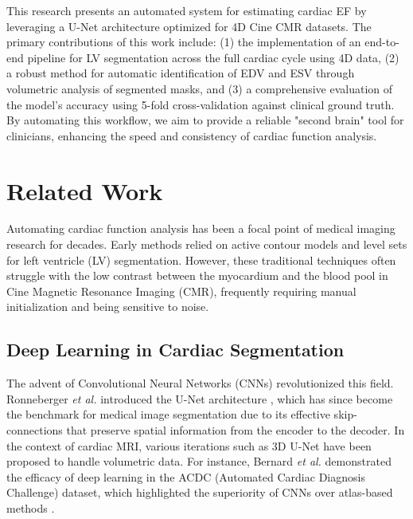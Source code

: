 \documentclass[final,3p,times,twocolumn]{elsarticle}
\begin{document}
This research presents an automated system for estimating cardiac EF by leveraging a U-Net architecture optimized for 4D Cine CMR datasets. The primary contributions of this work include: (1) the implementation of an end-to-end pipeline for LV segmentation across the full cardiac cycle using 4D data, (2) a robust method for automatic identification of EDV and ESV through volumetric analysis of segmented masks, and (3) a comprehensive evaluation of the model's accuracy using 5-fold cross-validation against clinical ground truth. By automating this workflow, we aim to provide a reliable "second brain" tool for clinicians, enhancing the speed and consistency of cardiac function analysis.

\section{Related Work}
\label{sec:related_work}
Automating cardiac function analysis has been a focal point of medical imaging research for decades. Early methods relied on active contour models and level sets for left ventricle (LV) segmentation. However, these traditional techniques often struggle with the low contrast between the myocardium and the blood pool in Cine Magnetic Resonance Imaging (CMR), frequently requiring manual initialization and being sensitive to noise.

\subsection{Deep Learning in Cardiac Segmentation}
The advent of Convolutional Neural Networks (CNNs) revolutionized this field. Ronneberger \textit{et al.} introduced the U-Net architecture \cite{b1}, which has since become the benchmark for medical image segmentation due to its effective skip-connections that preserve spatial information from the encoder to the decoder. In the context of cardiac MRI, various iterations such as 3D U-Net have been proposed to handle volumetric data. For instance, Bernard \textit{et al.} demonstrated the efficacy of deep learning in the ACDC (Automated Cardiac Diagnosis Challenge) dataset, which highlighted the superiority of CNNs over atlas-based methods \cite{b2}.
\end{document}
